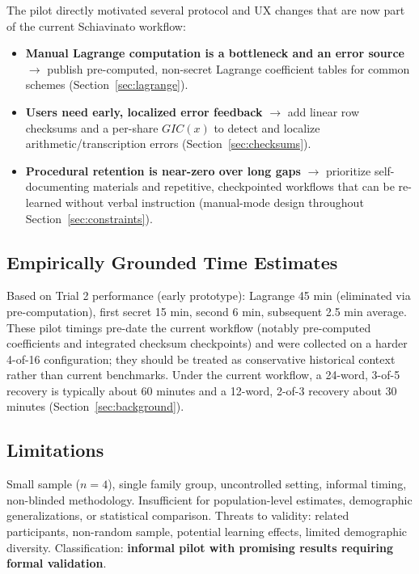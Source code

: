 \documentclass[11pt]{article}
\begin{document}
The pilot directly motivated several protocol and UX changes that are now part of the current Schiavinato workflow:
\begin{itemize}[noitemsep]
    \item \textbf{Manual Lagrange computation is a bottleneck and an error source} $\rightarrow$ publish pre-computed, non-secret Lagrange coefficient tables for common schemes (Section~\ref{sec:lagrange}).
    \item \textbf{Users need early, localized error feedback} $\rightarrow$ add linear row checksums and a per-share $GIC(x)$ to detect and localize arithmetic/transcription errors (Section~\ref{sec:checksums}).
    \item \textbf{Procedural retention is near-zero over long gaps} $\rightarrow$ prioritize self-documenting materials and repetitive, checkpointed workflows that can be re-learned without verbal instruction (manual-mode design throughout Section~\ref{sec:constraints}).
\end{itemize}

\subsection{Empirically Grounded Time Estimates}

Based on Trial 2 performance (early prototype): Lagrange 45 min (eliminated via pre-computation), first secret 15 min, second 6 min, subsequent 2.5 min average. These pilot timings pre-date the current workflow (notably pre-computed coefficients and integrated checksum checkpoints) and were collected on a harder 4-of-16 configuration; they should be treated as conservative historical context rather than current benchmarks. Under the current workflow, a 24-word, 3-of-5 recovery is typically about 60 minutes and a 12-word, 2-of-3 recovery about 30 minutes (Section~\ref{sec:background}).

\subsection{Limitations}

Small sample ($n=4$), single family group, uncontrolled setting, informal timing, non-blinded methodology. Insufficient for population-level estimates, demographic generalizations, or statistical comparison. Threats to validity: related participants, non-random sample, potential learning effects, limited demographic diversity. Classification: \textbf{informal pilot with promising results requiring formal validation}.
\end{document}
